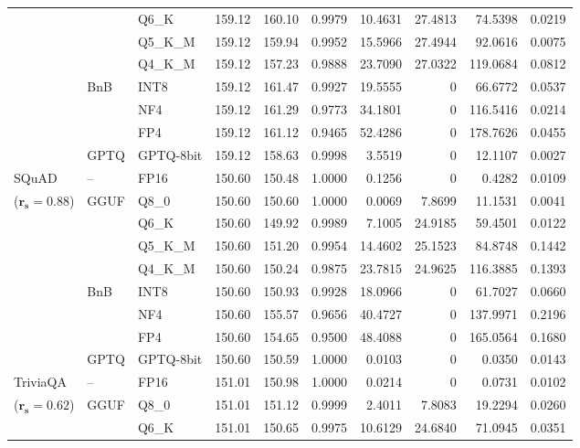 \begin{longtable}{ll l rrrrrrr}
 &  & Q6\_K & 159.12 & 160.10 & 0.9979 & 10.4631 & 27.4813 & 74.5398 & 0.0219 \\
 &  & Q5\_K\_M & 159.12 & 159.94 & 0.9952 & 15.5966 & 27.4944 & 92.0616 & 0.0075 \\
 &  & Q4\_K\_M & 159.12 & 157.23 & 0.9888 & 23.7090 & 27.0322 & 119.0684 & 0.0812 \\
 & BnB & INT8 & 159.12 & 161.47 & 0.9927 & 19.5555 & \cellcolor{cyan!12} $0$ & 66.6772 & 0.0537 \\
 &  & NF4 & 159.12 & 161.29 & 0.9773 & 34.1801 & \cellcolor{cyan!12} $0$ & 116.5416 & 0.0214 \\
 &  & FP4 & 159.12 & 161.12 & \cellcolor{red!18} 0.9465 & \cellcolor{red!18} 52.4286 & \cellcolor{cyan!12} $0$ & \cellcolor{red!18} 178.7626 & \cellcolor{red!18} 0.0455 \\
 & GPTQ & GPTQ-8bit & 159.12 & 158.63 & 0.9998 & 3.5519 & \cellcolor{cyan!12} $0$ & 12.1107 & 0.0027 \\
\midrule
SQuAD & -- & FP16 & 150.60 & 150.48 & 1.0000 & 0.1256 & \cellcolor{cyan!12} $0$ & 0.4282 & 0.0109 \\
{\small ($\mathbf{r_s{=}0.88}$)} & GGUF & Q8\_0 & 150.60 & 150.60 & 1.0000 & 0.0069 & 7.8699 & 11.1531 & 0.0041 \\
 &  & Q6\_K & 150.60 & 149.92 & 0.9989 & 7.1005 & 24.9185 & 59.4501 & 0.0122 \\
 &  & Q5\_K\_M & 150.60 & 151.20 & 0.9954 & 14.4602 & 25.1523 & 84.8748 & 0.1442 \\
 &  & Q4\_K\_M & 150.60 & 150.24 & 0.9875 & 23.7815 & 24.9625 & 116.3885 & 0.1393 \\
 & BnB & INT8 & 150.60 & 150.93 & 0.9928 & 18.0966 & \cellcolor{cyan!12} $0$ & 61.7027 & 0.0660 \\
 &  & NF4 & 150.60 & 155.57 & 0.9656 & 40.4727 & \cellcolor{cyan!12} $0$ & 137.9971 & 0.2196 \\
 &  & FP4 & 150.60 & 154.65 & 0.9500 & 48.4088 & \cellcolor{cyan!12} $0$ & 165.0564 & 0.1680 \\
 & GPTQ & GPTQ-8bit & 150.60 & 150.59 & 1.0000 & 0.0103 & \cellcolor{cyan!12} $0$ & 0.0350 & 0.0143 \\
\midrule
TriviaQA & -- & FP16 & 151.01 & 150.98 & 1.0000 & 0.0214 & \cellcolor{cyan!12} $0$ & 0.0731 & 0.0102 \\
{\small ($\mathbf{r_s{=}0.62}$)} & GGUF & Q8\_0 & 151.01 & 151.12 & 0.9999 & 2.4011 & 7.8083 & 19.2294 & 0.0260 \\
 &  & Q6\_K & 151.01 & 150.65 & 0.9975 & 10.6129 & 24.6840 & 71.0945 & 0.0351 \\

\end{longtable}
